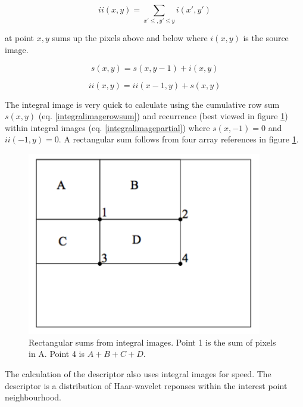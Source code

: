 \documentclass[english,12pt,a4paper,pdftex,elec,utf8]{aaltothesis}
\begin{document}
\begin{equation}
  \label{integralimage}
ii(x,y) = \sum\limits_{x'\le,y'\le y} i(x', y')
\end{equation}

at point $x, y$ sums up the pixels above and below where $i(x,y)$ is the source image. \cite{Viola2001}

\begin{equation}
  \label{integralimagerowsum}
s(x,y) = s(x, y - 1) + i(x,y)
\end{equation}

\begin{equation}
  \label{integralimagepartial}
  ii(x,y) = ii(x-1,y) + s(x,y)
\end{equation}

The integral image is very quick to calculate using the cumulative row sum $s(x,y)$ (eq. \ref{integralimagerowsum}) and recurrence (best viewed in figure \ref{integralimagefig}) within integral images (eq. \ref{integralimagepartial}) where $s(x, -1) = 0$ and $ii(-1,y)=0$. A rectangular sum follows from four array references in figure \ref{integralimagefig}.

\begin{figure}[htb]
\begin{center}
\includegraphics[height=8cm]{figures/integralimage}
\end{center}
\caption{Rectangular sums from integral images. Point 1 is the sum of pixels in A. Point 4 is $A + B + C + D$.\cite{Viola2001}}
\label{integralimagefig}
\end{figure}

The calculation of the descriptor also uses integral images for speed. The descriptor is a distribution of Haar-wavelet reponses within the interest point neighbourhood. \cite{Bay2006}
\end{document}
